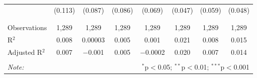 \begin{table}[!htbp]
\begin{tabular}{@{\extracolsep{5pt}}lccccccc}
  & (0.113) & (0.087) & (0.086) & (0.069) & (0.047) & (0.059) & (0.048) \\ 
  & & & & & & & \\ 
\hline \\[-1.8ex] 
Observations & 1,289 & 1,289 & 1,289 & 1,289 & 1,289 & 1,289 & 1,289 \\ 
R$^{2}$ & 0.008 & 0.00003 & 0.005 & 0.001 & 0.021 & 0.008 & 0.015 \\ 
Adjusted R$^{2}$ & 0.007 & $-$0.001 & 0.005 & $-$0.0002 & 0.020 & 0.007 & 0.014 \\ 
\hline 
\hline \\[-1.8ex] 
\textit{Note:}  & \multicolumn{7}{r}{$^{*}$p$<$0.05; $^{**}$p$<$0.01; $^{***}$p$<$0.001} \\ 
\end{tabular} 
\end{table} 
